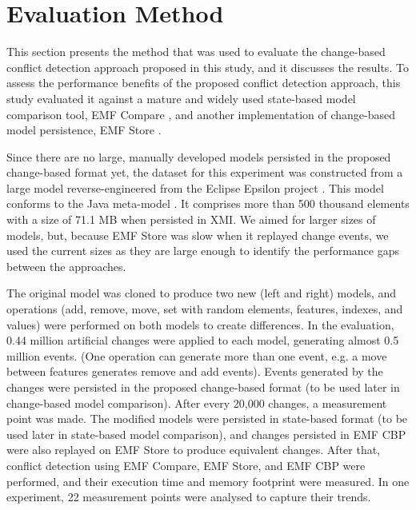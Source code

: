 \section{Evaluation Method}
\label{sec:evaluation_method}
This section presents the method that was used to evaluate the change-based conflict detection approach proposed in this study, and it discusses the results. To assess the performance benefits of the proposed conflict detection approach, this study evaluated it against a mature and widely used state-based model comparison tool, EMF Compare \cite{emfcompare2018developer,eclipse2017compare}, and another implementation of change-based model persistence, EMF Store \cite{koegel2010emfstore}.

Since there are no large, manually developed models persisted in the proposed change-based format yet, the dataset for this experiment was constructed from a large model reverse-engineered from the Eclipse Epsilon project \cite{eclipse2018epsilongit, eclipse2017epsilon}. This model conforms to the Java meta-model \cite{eclipse2018modiscojava}. It comprises more than 500 thousand elements with a size of 71.1 MB when persisted in XMI. We aimed for larger sizes of models, but, because EMF Store was slow when it replayed change events, we used the current sizes as they are large enough to identify the performance gaps between the approaches.

The original model was cloned to produce two new (left and right) models, and operations (\textsf{add}, \textsf{remove}, \textsf{move}, \textsf{set} with random elements, features, indexes, and values) were performed on both models to create differences. In the evaluation, 0.44 million artificial changes were applied to each model, generating almost 0.5 million events. (One operation can generate more than one event, e.g. a \textsf{move} between features generates \textsf{remove} and \textsf{add} events). Events generated by the changes were persisted in the proposed change-based format (to be used later in change-based model comparison). After every 20,000 changes, a measurement point was made. The modified models were persisted in state-based format (to be used later in state-based model comparison), and changes persisted in EMF CBP were also replayed on EMF Store to produce equivalent changes. After that, conflict detection using EMF Compare, EMF Store, and EMF CBP were performed, and their execution time and memory footprint were measured. In one experiment, 22 measurement points were analysed to capture their trends.


